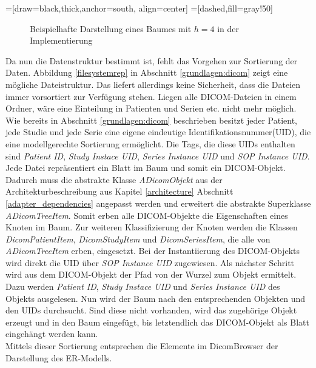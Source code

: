 =[draw=black,thick,anchor=south, align=center]
=[dashed,fill=gray!50]
\begin{figure}[htbp]
\centering
\caption{Beispielhafte Darstellung eines Baumes mit $h = 4$ in der Implementierung}
\label{treeexample}
\end{figure}

Da nun die Datenstruktur bestimmt ist, fehlt das Vorgehen zur Sortierung der Daten. Abbildung \ref{filesystemrep} in Abschnitt \ref{grundlagen:dicom} zeigt eine mögliche Dateistruktur. Das liefert allerdings keine Sicherheit, dass die Dateien immer vorsortiert zur Verfügung stehen. Liegen alle DICOM-Dateien in einem Ordner, wäre eine Einteilung in Patienten und Serien etc. nicht mehr möglich.\\
Wie bereits in Abschnitt \ref{grundlagen:dicom} beschrieben besitzt jeder Patient, jede Studie und jede Serie eine eigene eindeutige Identifikationsnummer(UID), die eine modellgerechte Sortierung ermöglicht. Die Tags, die diese UIDs enthalten sind \textit{Patient ID}, \textit{Study Instace UID}, \textit{Series Instance UID} und \textit{SOP Instance UID}.\\
Jede Datei repräsentiert ein Blatt im Baum und somit ein DICOM-Objekt. Dadurch muss die abstrakte Klasse \textit{ADicomObjekt} aus der Architekturbeschreibung aus Kapitel \ref{architecture} Abschnitt \ref{adapter_dependencies} angepasst werden und erweitert die abstrakte Superklasse \textit{ADicomTreeItem}. Somit erben alle DICOM-Objekte die Eigenschaften eines Knoten im Baum. Zur weiteren Klassifizierung der Knoten werden die Klassen \textit{DicomPatientItem}, \textit{DicomStudyItem} und \textit{DicomSeriesItem}, die alle von \textit{ADicomTreeItem} erben, eingesetzt.
Bei der Instantiierung des DICOM-Objekts wird direkt die UID über \textit{SOP Instance UID} zugewiesen. Als nächster Schritt wird aus dem DICOM-Objekt der Pfad von der Wurzel zum Objekt ermittelt. Dazu werden \textit{Patient ID}, \textit{Study Instace UID} und \textit{Series Instance UID} des Objekts ausgelesen. Nun wird der Baum nach den entsprechenden Objekten und den UIDs durchsucht. Sind diese nicht vorhanden, wird das zugehörige Objekt erzeugt und in den Baum eingefügt, bis letztendlich das DICOM-Objekt als Blatt eingehängt werden kann.\\
Mittels dieser Sortierung entsprechen die Elemente im DicomBrowser der Darstellung des ER-Modells.

